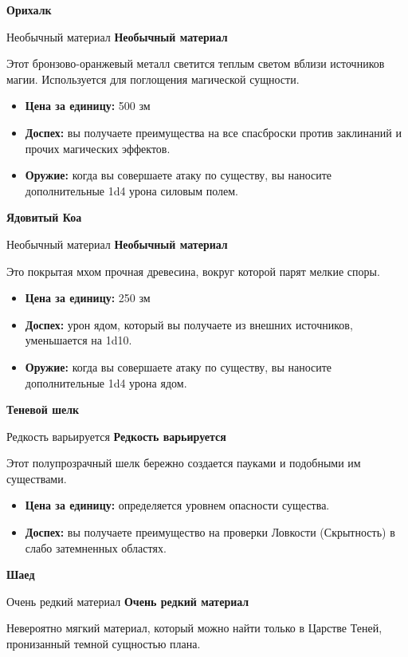 \documentclass[a4paper, 9pt, twocolumn]{book}
\newcommand{\partc}[2][]{{
		\bigskip
		\noindent
		\hspace{-0.25cm}
		\fontsize{11pt}{13.2}
		\color{sectioncolor}
		\textbf{#2}}
	
	{
		\ifx\relax#1\relax
		\else
		\noindent
		\normalcolor
		\textbf{#1}}
	\bigskip
	\fi
}
\begin{document}
	\partc[Необычный материал]{Орихалк}
	
	\noindent Этот бронзово-оранжевый металл светится теплым светом вблизи источников магии. Используется для поглощения магической сущности.
	
	\begin{itemize}
		\item \textbf{Цена за единицу:} 500 зм
		
		\item \textbf{Доспех:} вы получаете преимущества на все спасброски против заклинаний и прочих магических эффектов.
		
		\item \textbf{Оружие:} когда вы совершаете атаку по существу, вы наносите дополнительные 1d4 урона силовым полем. 
	\end{itemize}

	\partc[Необычный материал]{Ядовитый Коа}
	
	\noindent Это покрытая мхом прочная древесина, вокруг которой парят мелкие споры.
	
	\begin{itemize}
		\item \textbf{Цена за единицу:} 250 зм
		
		\item \textbf{Доспех:} урон ядом, который вы получаете из внешних источников, уменьшается на 1d10.
		
		\item \textbf{Оружие:} когда вы совершаете атаку по существу, вы наносите дополнительные 1d4 урона ядом.
	\end{itemize}

	\partc[Редкость варьируется]{Теневой шелк}
	
	\noindent Этот полупрозрачный шелк бережно создается пауками и подобными им существами.
	
	\begin{itemize}
		\item \textbf{Цена за единицу:} определяется уровнем опасности существа.
		
		\item \textbf{Доспех:} вы получаете преимущество на проверки Ловкости (Скрытность) в слабо затемненных областях.
	\end{itemize}

	\partc[Очень редкий материал]{Шаед}
	
	\noindent Невероятно мягкий материал, который можно найти только в Царстве Теней, пронизанный темной сущностью плана.
	
\end{document}
